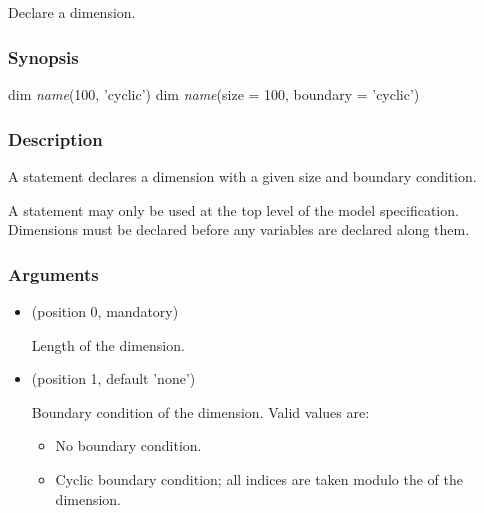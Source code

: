 \subsection{\label{dim}}

Declare a dimension.

\subsubsection*{Synopsis\label{dim_Synopsis}}
\begin{bicode}
    dim \textsl{name}(100, 'cyclic')
    dim \textsl{name}(size = 100, boundary = 'cyclic')
\end{bicode}


\subsubsection*{Description\label{dim_Description}}

A  statement declares a dimension with a given size and boundary
condition.

A  statement may only be used at the top level of the model
specification. Dimensions must be declared before any variables are declared
along them.

\subsubsection*{Arguments\label{dim_Arguments}}

\begin{itemize}
\item {} (position 0, mandatory)

Length of the dimension.

\item {} (position 1, default 'none')

Boundary condition of the dimension. Valid values are:

\begin{itemize}

\item {}

No boundary condition.

\item {}

Cyclic boundary condition; all indices are taken modulo the  of
the dimension.

\end{itemize}
\end{itemize}

